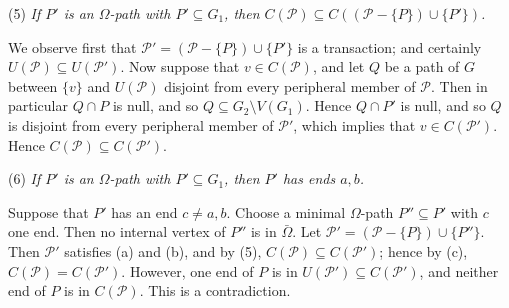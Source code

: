 \hspace*{12pt}(5) \textit{If $P'$ is an $\Omega$-path with $P' \subseteq G_1$, then $C(\mathcal{P}) \subseteq C((\mathcal{P} - \{P\}) \cup \{P'\})$.}

We observe first that $\mathcal{P}' = (\mathcal{P} - \{P\}) \cup \{P'\}$ is a transaction; and certainly $U(\mathcal{P}) \subseteq U(\mathcal{P}')$. Now suppose that $v \in C(\mathcal{P})$, and let $Q$ be a path of $G$ between $\{v\}$ and $U(\mathcal{P})$ disjoint from every peripheral member of $\mathcal{P}$. Then in particular $Q \cap P$ is null, and so $Q \subseteq G_2 \setminus V(G_1)$. Hence $Q \cap P'$ is null, and so $Q$ is disjoint from every peripheral member of $\mathcal{P}'$, which implies that $v \in C(\mathcal{P}')$. Hence $C(\mathcal{P}) \subseteq C(\mathcal{P}')$.

\hspace*{12pt}(6) \textit{If $P'$ is an $\Omega$-path with $P' \subseteq G_1$, then $P'$ has ends $a, b$.}

Suppose that $P'$ has an end $c \ne a, b$. Choose a minimal $\Omega$-path $P'' \subseteq P'$ with $c$ one end. Then no internal vertex of $P''$ is in $\bar{\Omega}$. Let $\mathcal{P}' = (\mathcal{P} - \{P\}) \cup \{P''\}$. Then $\mathcal{P}'$ satisfies (a) and (b), and by (5), $C(\mathcal{P}) \subseteq C(\mathcal{P}')$; hence by (c), $C(\mathcal{P}) = C(\mathcal{P}')$. However, one end of $P$ is in $U(\mathcal{P}') \subseteq C(\mathcal{P}')$, and neither end of $P$ is in $C(\mathcal{P})$. This is a contradiction.
